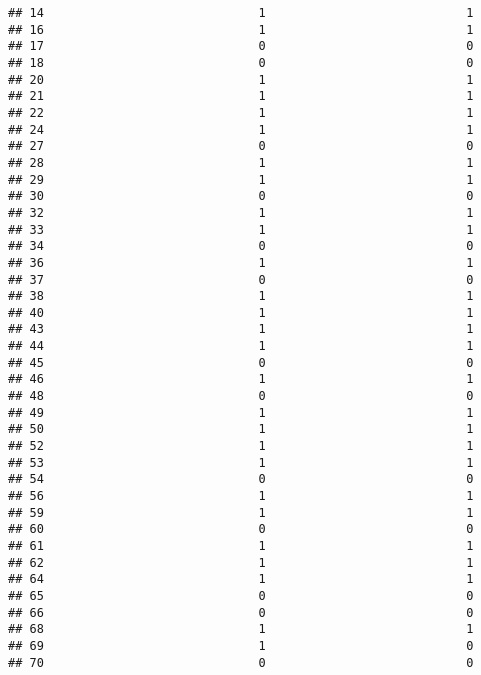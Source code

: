 \documentclass[
]{article}
\begin{document}
\begin{verbatim}
## 14                              1                            1
## 16                              1                            1
## 17                              0                            0
## 18                              0                            0
## 20                              1                            1
## 21                              1                            1
## 22                              1                            1
## 24                              1                            1
## 27                              0                            0
## 28                              1                            1
## 29                              1                            1
## 30                              0                            0
## 32                              1                            1
## 33                              1                            1
## 34                              0                            0
## 36                              1                            1
## 37                              0                            0
## 38                              1                            1
## 40                              1                            1
## 43                              1                            1
## 44                              1                            1
## 45                              0                            0
## 46                              1                            1
## 48                              0                            0
## 49                              1                            1
## 50                              1                            1
## 52                              1                            1
## 53                              1                            1
## 54                              0                            0
## 56                              1                            1
## 59                              1                            1
## 60                              0                            0
## 61                              1                            1
## 62                              1                            1
## 64                              1                            1
## 65                              0                            0
## 66                              0                            0
## 68                              1                            1
## 69                              1                            0
## 70                              0                            0

\end{verbatim}
\end{document}
